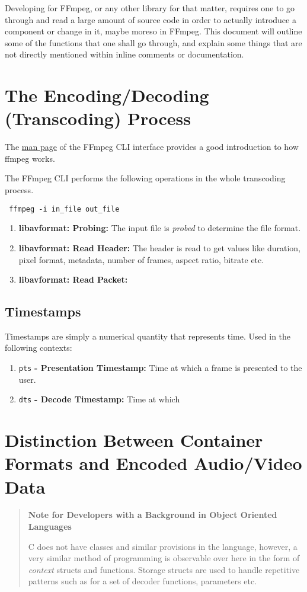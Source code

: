\documentclass{article}
\begin{document}
Developing for FFmpeg, or any other library for that matter, requires one to go through and read a large amount of source code in order to actually introduce a component or change in it, maybe moreso in FFmpeg. This document will outline some of the functions that one shall go through, and explain some things that are not directly mentioned within inline comments or documentation.

\section{The Encoding/Decoding (Transcoding) Process}

The \href{https://ffmpeg.org/ffmpeg.html\#toc-Detailed-description}{man page} of the FFmpeg CLI interface provides a good introduction to how ffmpeg works.

The FFmpeg CLI performs the following operations in the whole transcoding process.

\texttt{
ffmpeg -i in\_file out\_file
}

\begin{enumerate}
\item \textbf{libavformat: Probing:} The input file is \emph{probed} to determine the file format.
\item \textbf{libavformat: Read Header:} The header is read to get values like duration, pixel format, metadata, number of frames, aspect ratio, bitrate etc.
\item \textbf{libavformat: Read Packet:} 
\end{enumerate}

\subsection{Timestamps}

Timestamps are simply a numerical quantity that represents time. Used in the following contexts:

\begin{enumerate}
\item \texttt{pts} \textbf{- Presentation Timestamp:} Time at which a frame is presented to the user.
\item \texttt{dts} \textbf{- Decode Timestamp:} Time at which 
\end{enumerate}

\section{Distinction Between Container Formats and Encoded Audio/Video Data}
\begin{quote}
\textbf{Note for Developers with a Background in Object Oriented Languages}

C does not have classes and similar provisions in the language, however, a very 
similar method of programming is observable over here in the form of 
\emph{context} structs and functions. Storage structs are used to handle 
repetitive patterns such as for a set of decoder functions, parameters etc.


\end{quote}
\end{document}
